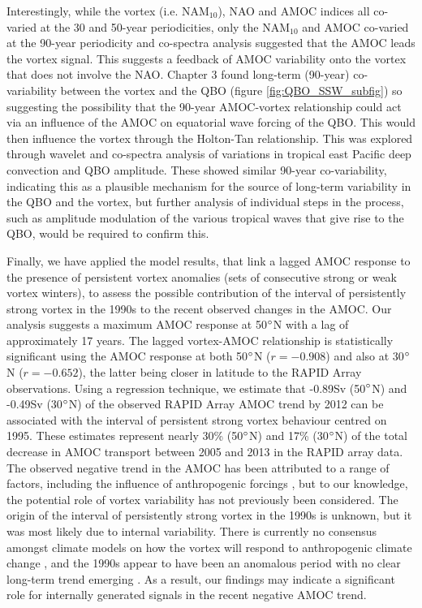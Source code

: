Interestingly, while the vortex (i.e. NAM$_{10}$), NAO and AMOC indices all co-varied at the 30 and 50-year periodicities, only the NAM$_{10}$ and AMOC co-varied at the 90-year periodicity and co-spectra analysis suggested that the AMOC leads the vortex signal. This suggests a feedback of AMOC variability onto the vortex that does not involve the NAO. Chapter 3 found long-term (90-year) co-variability between the vortex and the QBO (figure \ref{fig:QBO_SSW_subfig}) so suggesting the possibility that the 90-year AMOC-vortex relationship could act via an influence of the AMOC on equatorial wave forcing of the QBO. This would then influence the vortex through the Holton-Tan relationship.  This was explored through wavelet and co-spectra analysis of variations in tropical east Pacific deep convection and QBO amplitude. These showed similar 90-year co-variability, indicating this as a plausible mechanism for the source of long-term variability in the QBO and the vortex, but further analysis of individual steps in the process, such as amplitude modulation of the various tropical waves that give rise to the QBO, would be required to confirm this.

Finally, we have applied the model results, that link a lagged AMOC response to the presence of persistent vortex anomalies (sets of consecutive strong or weak vortex winters), to assess the possible contribution  of the interval of persistently strong vortex in the 1990s to the recent observed changes in the AMOC. Our analysis suggests a maximum AMOC response at 50$\degree$N with a lag of approximately 17 years. The lagged vortex-AMOC relationship is statistically significant using the AMOC response at both 50$\degree$N ($r = -0.908$) and also at 30$\degree$N ($r = -0.652$), the latter being closer in latitude to the RAPID Array observations. Using a regression technique, we estimate that -0.89Sv (50$\degree$N) and -0.49Sv (30$\degree$N) of the observed RAPID Array AMOC trend by 2012 can be associated with the interval of persistent strong vortex behaviour centred on 1995. These estimates represent nearly 30\% (50$\degree$N) and 17\% (30$\degree$N) of the total decrease in AMOC transport between 2005 and 2013 in the RAPID array data. The observed negative trend in the AMOC has been attributed to a range of factors, including the influence of anthropogenic forcings \citep{caesarObserved2018, caesarCurrent2021}, but to our knowledge, the potential role of vortex variability has not previously been considered. The origin of the interval of persistently strong vortex in the 1990s is unknown, but it was most likely due to internal variability. There is currently no consensus amongst climate models on how the vortex will respond to anthropogenic climate change \citep{ayarzaguenaUncertainty2020b}, and the 1990s appear to have been an anomalous period with no clear long-term trend emerging \citep{domeisenEstimating2019d}. As a result, our findings may indicate a significant role for internally generated signals in the recent negative AMOC trend. 

